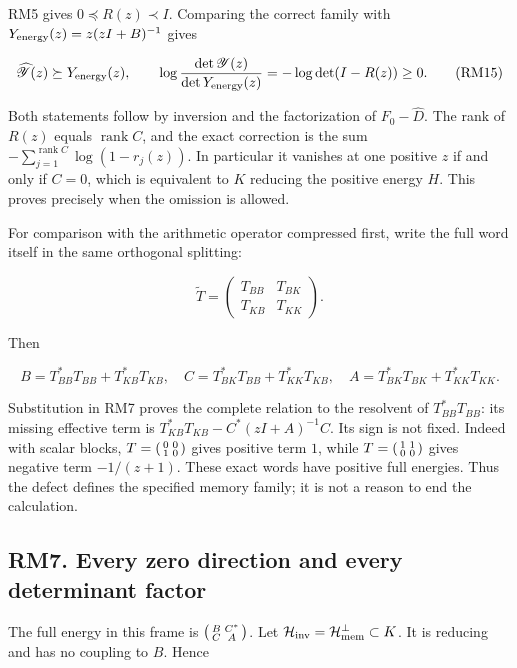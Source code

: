 \documentclass[11pt]{article}
\begin{document}
RM5 gives \(0\preceq R(z)\prec I\). Comparing the correct family with \(Y_{\rm energy}(z)=z(zI+B)^{-1}\) gives

\[
 \widehat{\mathscr Y}(z)\succeq Y_{\rm energy}(z),\qquad
 \log\frac{\det\mathscr Y(z)}{\det Y_{\rm energy}(z)}
 =-\log\det(I-R(z))\ge0.
 \tag{RM15}
\]

Both statements follow by inversion and the factorization of \(F_0-\widehat D\). The rank of \(R(z)\) equals \(\operatorname{rank}C\), and the exact correction is the sum \(-\sum_{j=1}^{\operatorname{rank}C}\log(1-r_j(z))\). In particular it vanishes at one positive \(z\) if and only if \(C=0\), which is equivalent to \(K\) reducing the positive energy \(H\). This proves precisely when the omission is allowed.

For comparison with the arithmetic operator compressed first, write the full word itself in the same orthogonal splitting:

\[
 \widetilde T=\begin{pmatrix}T_{BB}&T_{BK}\\T_{KB}&T_{KK}\end{pmatrix}.
\]

Then

\[
 B=T_{BB}^*T_{BB}+T_{KB}^*T_{KB},\quad
 C=T_{BK}^*T_{BB}+T_{KK}^*T_{KB},\quad
 A=T_{BK}^*T_{BK}+T_{KK}^*T_{KK}.
 \tag{RM16}
\]

Substitution in RM7 proves the complete relation to the resolvent of \(T_{BB}^*T_{BB}\): its missing effective term is \(T_{KB}^*T_{KB}-C^*(zI+A)^{-1}C\). Its sign is not fixed. Indeed with scalar blocks, \(T=\begin{psmallmatrix}0&0\\1&0\end{psmallmatrix}\) gives positive term \(1\), while \(T=\begin{psmallmatrix}1&1\\0&0\end{psmallmatrix}\) gives negative term \(-1/(z+1)\). These exact words have positive full energies. Thus the defect defines the specified memory family; it is not a reason to end the calculation.

\subsection{RM7. Every zero direction and every determinant factor}\label{rm7.-every-zero-direction-and-every-determinant-factor}

The full energy in this frame is \(\begin{psmallmatrix}B&C^*\\C&A\end{psmallmatrix}\). Let \(\mathcal H_{\rm inv}=\mathcal H_{\rm mem}^{\perp}\subset K\). It is reducing and has no coupling to \(B\). Hence
\end{document}
